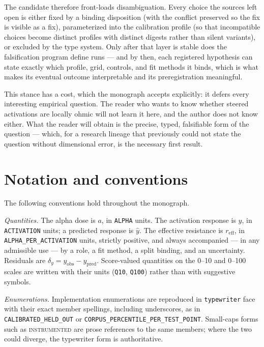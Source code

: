 The candidate therefore front-loads disambiguation. Every choice the sources left open is either fixed by a binding disposition (with the conflict preserved so the fix is visible as a fix), parameterized into the calibration profile (so that incompatible choices become distinct profiles with distinct digests rather than silent variants), or excluded by the type system. Only after that layer is stable does the falsification program define runs --- and by then, each registered hypothesis can state exactly which profile, grid, controls, and fit methods it binds, which is what makes its eventual outcome interpretable and its preregistration meaningful.

This stance has a cost, which the monograph accepts explicitly: it defers every interesting empirical question. The reader who wants to know whether steered activations are locally ohmic will not learn it here, and the author does not know either. What the reader will obtain is the precise, typed, falsifiable form of the question --- which, for a research lineage that previously could not state the question without dimensional error, is the necessary first result.

\section{Notation and conventions}\label{ch01:notation}

The following conventions hold throughout the monograph.

\emph{Quantities.} The alpha dose is $a$, in \texttt{ALPHA} units. The activation response is $y$, in \texttt{ACTIVATION} units; a predicted response is $\hat{y}$. The effective resistance is $r_{\mathrm{eff}}$, in \texttt{ALPHA\_PER\_ACTIVATION} units, strictly positive, and always accompanied --- in any admissible use --- by a role, a fit method, a split binding, and an uncertainty. Residuals are $\delta_y = y_{\mathrm{obs}} - y_{\mathrm{pred}}$. Score-valued quantities on the 0--10 and 0--100 scales are written with their units (\texttt{Q10}, \texttt{Q100}) rather than with suggestive symbols.

\emph{Enumerations.} Implementation enumerations are reproduced in \texttt{typewriter} face with their exact member spellings, including underscores, as in \texttt{CALIBRATED\_HELD\_OUT} or \texttt{CORPUS\_PERCENTILE\_PER\_TEST\_POINT}. Small-caps forms such as \textsc{instrumented} are prose references to the same members; where the two could diverge, the typewriter form is authoritative.

